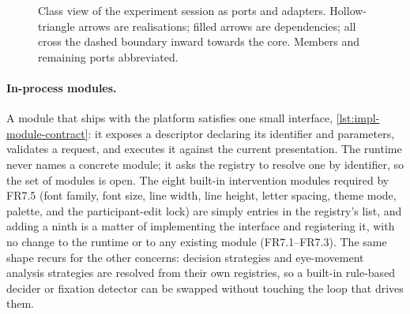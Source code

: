 \begin{figure}[htbp]
{%
}
\caption[Ports-and-adapters realisation around the session manager.]{Class view of the experiment session as ports and adapters. Hollow-triangle arrows are realisations; filled arrows are dependencies; all cross the dashed boundary inward towards the core. Members and remaining ports abbreviated.}
\label{fig:impl-session-manager}
\end{figure}

\paragraph{In-process modules.}
A module that ships with the platform satisfies one small interface, \cref{lst:impl-module-contract}: it exposes a descriptor declaring its identifier and parameters, validates a request, and executes it against the current presentation.
The runtime never names a concrete module; it asks the registry to resolve one by identifier, so the set of modules is open.
The eight built-in intervention modules required by FR7.5 (font family, font size, line width, line height, letter spacing, theme mode, palette, and the participant-edit lock) are simply entries in the registry's list, and adding a ninth is a matter of implementing the interface and registering it, with no change to the runtime or to any existing module (FR7.1--FR7.3).
The same shape recurs for the other concerns: decision strategies and eye-movement analysis strategies are resolved from their own registries, so a built-in rule-based decider or fixation detector can be swapped without touching the loop that drives them.

